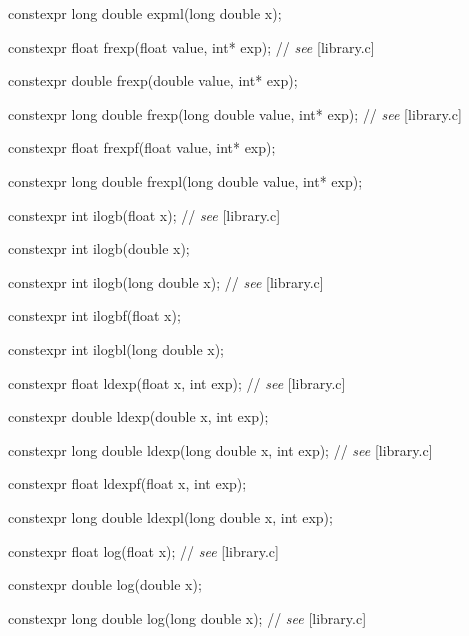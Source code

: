 \documentclass[prd,twocolumn,amsmath,amssymb,nofootinbib,eqsecnum]{revtex4-1}
\newcommand{\highlight}[1]{{\color{red} #1}}
\newcommand{\oldhighlight}[1]{{\color{green} #1}}
\newcommand{\stdcomment}[1]{{// {\em see} [#1]}}
\begin{document}
{\highlight{constexpr} long double expml(long double x);

\vspace{2ex}


\oldhighlight{constexpr}  float frexp(float value, int* exp); \stdcomment{library.c}

\oldhighlight{constexpr}  double frexp(double value, int* exp);

\oldhighlight{constexpr}  long double frexp(long double value, int* exp); \stdcomment{library.c}

\oldhighlight{constexpr}  float frexpf(float value, int* exp);

\oldhighlight{constexpr}  long double frexpl(long double value, int* exp);

\vspace{2ex}


\oldhighlight{constexpr} int ilogb(float x); \stdcomment{library.c}

\oldhighlight{constexpr} int ilogb(double x);

\oldhighlight{constexpr} int ilogb(long double x); \stdcomment{library.c}

\oldhighlight{constexpr} int ilogbf(float x);

\oldhighlight{constexpr} int ilogbl(long double x);

\vspace{2ex}


\oldhighlight{constexpr} float ldexp(float x, int exp); \stdcomment{library.c}

\oldhighlight{constexpr} double ldexp(double x, int exp);

\oldhighlight{constexpr} long double ldexp(long double x, int exp); \stdcomment{library.c}

\oldhighlight{constexpr} float ldexpf(float x, int exp);

\oldhighlight{constexpr} long double ldexpl(long double x, int exp);

\vspace{2ex}


\highlight{constexpr} float log(float x); \stdcomment{library.c}

\highlight{constexpr} double log(double x);

\highlight{constexpr} long double log(long double x); \stdcomment{library.c}

}
\end{document}
